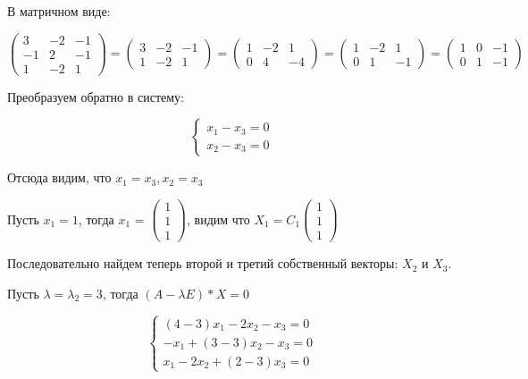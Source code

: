\documentclass{article}
\begin{document}
В матричном виде:

$\begin{pmatrix}
    3 & -2 & - 1 \\
    -1 & 2 & -1 \\
    1 & -2 & 1
\end{pmatrix} = \begin{pmatrix}
    3 & -2 & -1 \\
    1 & -2 & 1
\end{pmatrix} = \begin{pmatrix}
    1 & -2 & 1 \\
    0 & 4 & -4
\end{pmatrix} = \begin{pmatrix}
    1 & -2 & 1 \\ 
    0 & 1 & -1
\end{pmatrix} = \begin{pmatrix}
    1 & 0 & -1 \\
    0 & 1 & -1
\end{pmatrix}$

Преобразуем обратно в систему:

\begin{equation}
    \begin{cases}
        x_1 - x_3 = 0 \\
        x_2 - x_3 = 0 
    \end{cases}
\end{equation}

Отсюда видим, что $x_1 = x_3, x_2 = x_3$

Пусть $x_1 = 1$, тогда $x_1$ = $\begin{pmatrix}
    1 \\
    1 \\
    1
\end{pmatrix}$, видим что $X_1 = C_1 \begin{pmatrix}
    1 \\
    1 \\
    1
\end{pmatrix}$

Последовательно найдем теперь второй и третий собственный векторы: $X_2$ и $X_3$.

Пусть $\lambda = \lambda_2 = 3$, тогда $(A - \lambda E) * X = 0$

\begin{equation}
    \begin{cases}
        (4-3)x_1 - 2x_2 - x_3 = 0 \\
        -x_1 + (3 - 3)x_2 - x_3 = 0 \\
        x_1 - 2x_2 + (2 - 3)x_3 = 0
    \end{cases}
\end{equation}
\end{document}
